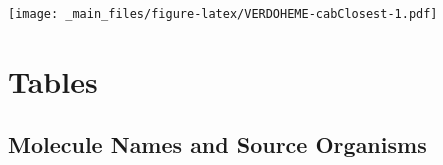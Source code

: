 \documentclass[a4paper, nobind]{templates/ociamthesis}
\let\origfigure\figure
\let\endorigfigure\endfigure
\renewenvironment{figure}[1][2] {
    \expandafter\origfigure\expandafter[H]
} {
    \endorigfigure
}
\begin{document}
\begin{figure}
\centering
\texttt{[image: \_main\_files/figure-latex/VERDOHEME-cabClosest-1.pdf]}
\caption{\label{fig:VERDOHEME-cabClosest}VERDOHEME: CACBFe Angles of Closest Residues}
\end{figure}

\hypertarget{a-tables}{%
\chapter{Tables}\label{a-tables}}

\hypertarget{molOrgSec}{%
\section{Molecule Names and Source Organisms}\label{molOrgSec}}
\end{document}
